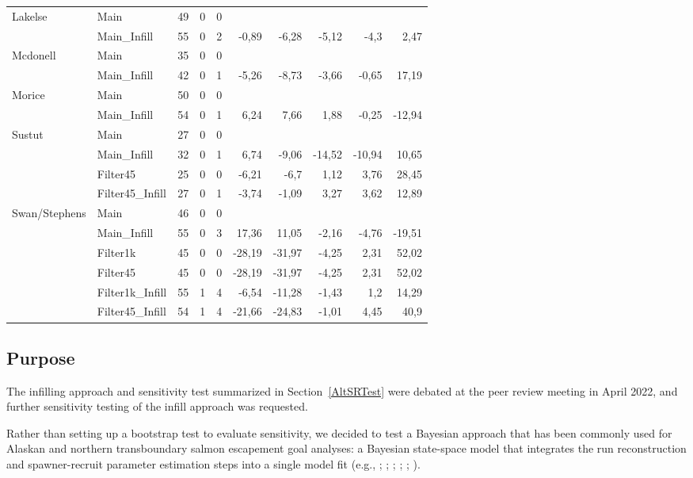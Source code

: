 \documentclass[french,11pt]{book}
\begin{document}
\begin{longtable}[t]{lllrrrrrrr}
\midrule Lakelse & Main & 49 & 0 & 0 &  &  &  &  & \\  & Main\_Infill & 55 & 0 & 2 & -0,89 & -6,28 & -5,12 & -4,3 & 2,47\\
\midrule Mcdonell & Main & 35 & 0 & 0 &  &  &  &  & \\  & Main\_Infill & 42 & 0 & 1 & -5,26 & -8,73 & -3,66 & -0,65 & 17,19\\
\midrule Morice & Main & 50 & 0 & 0 &  &  &  &  & \\  & Main\_Infill & 54 & 0 & 1 & 6,24 & 7,66 & 1,88 & -0,25 & -12,94\\
\midrule Sustut & Main & 27 & 0 & 0 &  &  &  &  & \\  & Main\_Infill & 32 & 0 & 1 & 6,74 & -9,06 & -14,52 & -10,94 & 10,65\\  & Filter45 & 25 & 0 & 0 & -6,21 & -6,7 & 1,12 & 3,76 & 28,45\\  & Filter45\_Infill & 27 & 0 & 1 & -3,74 & -1,09 & 3,27 & 3,62 & 12,89\\
\midrule Swan/Stephens & Main & 46 & 0 & 0 &  &  &  &  & \\  & Main\_Infill & 55 & 0 & 3 & 17,36 & 11,05 & -2,16 & -4,76 & -19,51\\  & Filter1k & 45 & 0 & 0 & -28,19 & -31,97 & -4,25 & 2,31 & 52,02\\  & Filter45 & 45 & 0 & 0 & -28,19 & -31,97 & -4,25 & 2,31 & 52,02\\  & Filter1k\_Infill & 55 & 1 & 4 & -6,54 & -11,28 & -1,43 & 1,2 & 14,29\\  & Filter45\_Infill & 54 & 1 & 4 & -21,66 & -24,83 & -1,01 & 4,45 & 40,9\\* \end{longtable}

\endgroup{} \endgroup{}

\clearpage

\label{StateSpaceTest}

\subsection{Purpose}\label{purpose-2}

The infilling approach and sensitivity test summarized in Section~\ref{AltSRTest} were debated at the peer review meeting in April 2022, and further sensitivity testing of the infill approach was requested.

Rather than setting up a bootstrap test to evaluate sensitivity, we decided to test a Bayesian approach that has been commonly used for Alaskan and northern transboundary salmon escapement goal analyses: a Bayesian state-space model that integrates the run reconstruction and spawner-recruit parameter estimation steps into a single model fit (e.g., ; ; ; ; ; ).
\end{document}
